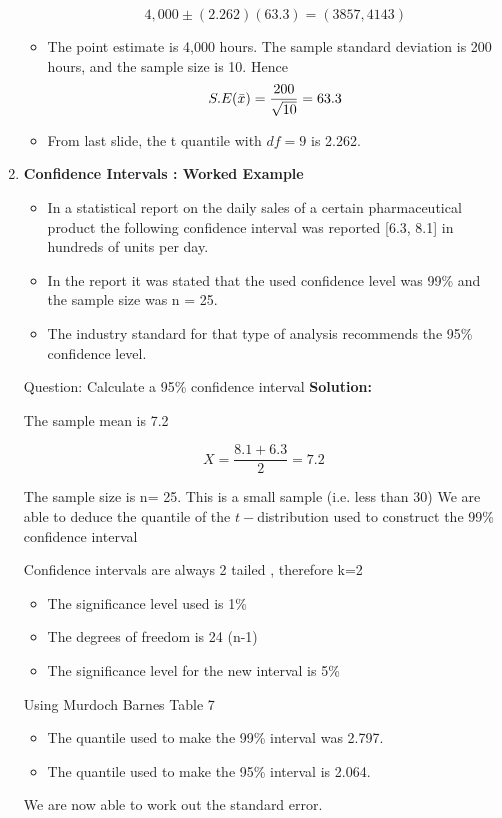\documentclass[]{report}
\begin{document}
\begin{enumerate}
\begin{itemize}
		\[4,000\pm(2.262)(63.3)  = (3857,4143)\]
		
		\item The point estimate is 4,000 hours. The sample standard deviation is 200 hours, and the sample size is 10. Hence
		\[S.E(\bar{x} ) = { 200 \over \sqrt{10}} = 63.3\]
		
		\item From last slide, the t quantile with $df=9$ is 2.262.
	\end{itemize}
	
	\item \textbf{Confidence Intervals : Worked Example}\\
	
	\begin{itemize} 
		\item In a statistical report on the daily sales of a certain pharmaceutical product the following confidence interval was reported [6.3, 8.1] in hundreds of units per day.
		
		\item In the report it was stated that the used confidence level was 99\% and the sample size was n = 25. 
		\item The industry standard for that type of analysis recommends the 95\% confidence level.
	\end{itemize}
	Question: Calculate a 95\% confidence interval
	\textbf{Solution:}
	
	The sample mean is 7.2
	
	\[X=\frac{8.1 + 6.3}{2}=7.2\]
	
	The sample size is n= 25. This is a small sample (i.e. less than 30)
	We are able to deduce the quantile of the $t-$distribution used to construct the 99\% confidence interval
	
	Confidence intervals are always 2 tailed , therefore k=2
	\begin{itemize}
		\item The significance level used is 1\%
		\item The degrees of freedom  is 24 (n-1)
		\item The significance level for the new interval is 5\%
	\end{itemize}
	Using Murdoch Barnes Table 7
	\begin{itemize}
		\item The quantile used to make the 99\% interval was 2.797.
		\item The quantile used to make the 95\% interval is 2.064.
	\end{itemize}
	We are now able to work out the standard error.
	

\end{enumerate}
\end{document}
